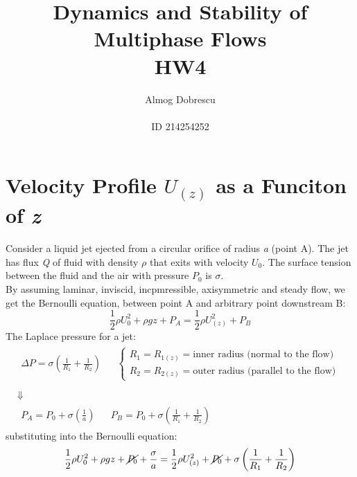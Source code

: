 \documentclass[11pt, a4paper]{article}
\title{Dynamics and Stability of Multiphase Flows \\ HW4}
\author{Almog Dobrescu\\\\ID 214254252}
\begin{document}
\maketitle

\thispagestyle{empty}
\newpage
\setcounter{page}{1}

\tableofcontents
\vfil
\listoffigures
\newpage

\section{Velocity Profile $U_{\left(z\right)}$ as a Funciton of \emph{z}}
Consider a liquid jet ejected from a circular orifice of radius \emph{a} (point A). The jet has flux \emph{Q} of fluid with density $\rho$ that exits with velocity $U_0$. The surface tension between the fluid and the air with pressure $P_0$ is $\sigma$. \\
By assuming laminar, inviscid, incpmressible, axisymmetric and steady flow, we get the Bernoulli equation, between point A and arbitrary point downstream B:
\begin{equation}
    \frac{1}{2}\rho U_0^2+\rho gz+P_A=\frac{1}{2}\rho U_{\left(z\right)}^2+P_B
\end{equation}
The Laplace pressure for a jet:
\begin{equation}
    \begin{array}{c}
        \begin{matrix}
            \displaystyle\Delta P=\sigma\left(\frac{1}{R_1}+\frac{1}{R_2}\right) && \left\{\begin{array}{l}
                R_1=R_{1\left(z\right)}=\text{inner radius (normal to the flow)} \\
                R_2=R_{2\left(z\right)}=\text{outer radius (parallel to the flow)}
            \end{array}\right.
        \end{matrix} \\\\
        \Downarrow \\
        \begin{matrix}
            \displaystyle P_A=P_0+\sigma\left(\frac{1}{a}\right) && \displaystyle P_B=P_0+\sigma\left(\frac{1}{R_1}+\frac{1}{R_2}\right)
        \end{matrix}
    \end{array}
\end{equation}
substituting into the Bernoulli equation:
\begin{equation}
    \frac{1}{2}\rho U_0^2+\rho gz+\cancel{P_0}+\frac{\sigma}{a}=\frac{1}{2}\rho U_{\left(z\right)}^2+\cancel{P_0}+\sigma\left(\frac{1}{R_1}+\frac{1}{R_2}\right)
\end{equation}
\end{document}
